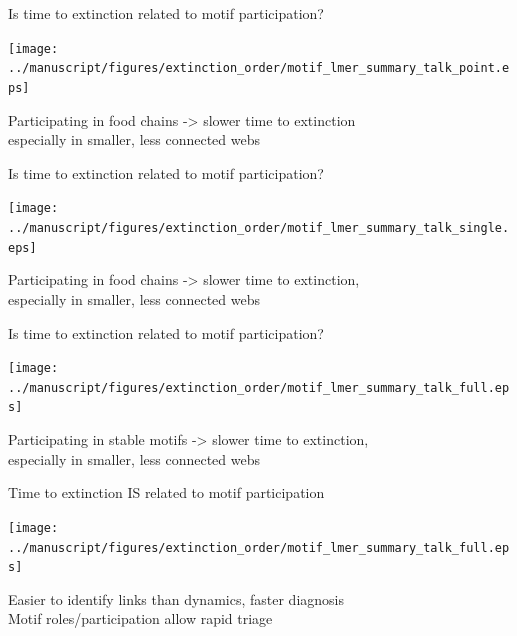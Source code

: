 \documentclass{beamer}
\begin{document}
  \begin{frame}{Is time to extinction related to motif participation?}

    \begin{centering}

      \texttt{[image: ../manuscript/figures/extinction\_order/motif\_lmer\_summary\_talk\_point.eps]}

    \end{centering}

    Participating in food chains -> slower time to extinction\\
    {\color{white}especially in smaller, less connected webs}

    \end{frame}

  \begin{frame}{Is time to extinction related to motif participation?}

    \begin{centering}

      \texttt{[image: ../manuscript/figures/extinction\_order/motif\_lmer\_summary\_talk\_single.eps]}

    \end{centering}

    Participating in food chains -> slower time to extinction,\\
    especially in smaller, less connected webs

    \end{frame}

  \begin{frame}{Is time to extinction related to motif participation?}

    \begin{centering}

      \texttt{[image: ../manuscript/figures/extinction\_order/motif\_lmer\_summary\_talk\_full.eps]}

    \end{centering}

    Participating in stable motifs -> slower time to extinction,\\
    especially in smaller, less connected webs

    \end{frame}

  \begin{frame}{Time to extinction IS related to motif participation}

    \begin{centering}

      \texttt{[image: ../manuscript/figures/extinction\_order/motif\_lmer\_summary\_talk\_full.eps]}


    {\color{DarkBlue}Easier to identify links than dynamics, faster diagnosis\\}
    {\color{white}Motif roles/participation allow rapid triage}
    \end{centering}

    \end{frame}
\end{document}
